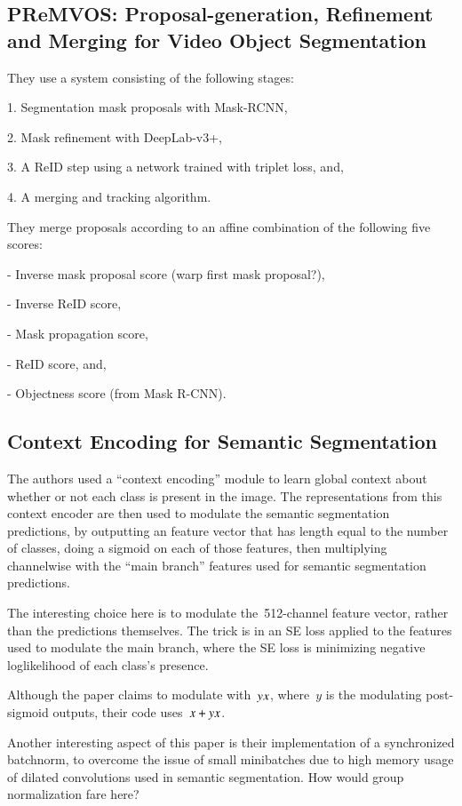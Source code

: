 \documentclass[a4paper, 12pt]{article}
\begin{document}
\subsection{PReMVOS: Proposal-generation, Refinement and Merging for Video
            Object Segmentation~\cite{luiten2018premvos}}

They use a system consisting of the following stages:

1. Segmentation mask proposals with Mask-RCNN,

2. Mask refinement with DeepLab-v3+,

3. A ReID step using a network trained with triplet loss, and,

4. A merging and tracking algorithm.


They merge proposals according to an affine combination of the following five
scores:

- Inverse mask proposal score (warp first mask proposal?),

- Inverse ReID score,

- Mask propagation score,

- ReID score, and,

- Objectness score (from Mask R-CNN).


\subsection{Context Encoding for Semantic Segmentation~\cite{Zhang_2018_CVPR}}

The authors used a ``context encoding'' module to learn global context about
whether or not each class is present in the image. The representations from
this context encoder are then used to modulate the semantic segmentation
predictions, by outputting an feature vector that has length equal to the
number of classes, doing a sigmoid on each of those features, then multiplying
channelwise with the ``main branch'' features used for semantic segmentation
predictions.

The interesting choice here is to modulate the~\num{512}-channel feature
vector, rather than the predictions themselves. The trick is in an SE loss
applied to the features used to modulate the main branch, where the SE loss is
minimizing negative loglikelihood of each class's presence.

Although the paper claims to modulate with~$y \* x$, where~$y$ is the
modulating post-sigmoid outputs, their code uses~$x + y \* x$.

Another interesting aspect of this paper is their implementation of a
synchronized batchnorm, to overcome the issue of small minibatches due to high
memory usage of dilated convolutions used in semantic segmentation. How would
group normalization fare here?
\end{document}
